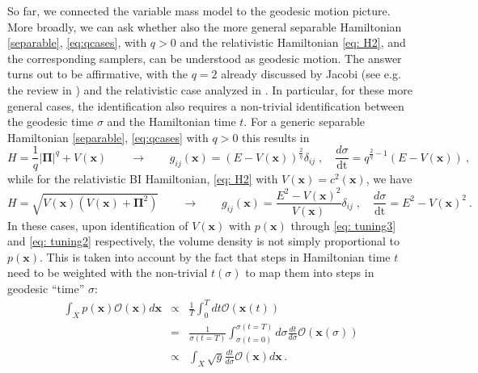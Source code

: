 \documentclass[twoside,11pt]{article}
\begin{document}
So far, we connected the variable mass model to the geodesic motion picture. 
More broadly, we can ask whether also the more general separable Hamiltonian \eqref{separable}, \eqref{eq:qcases}, with $q>0$ and the
relativistic Hamiltonian \eqref{eq: H2}, and the corresponding samplers, can be understood as geodesic motion.
The answer turns out to be affirmative, with the $q = 2$ already discussed by Jacobi (see e.g. the review in \citet{pettini2007geometry}) and the relativistic case analyzed in \citet{gibbons2015jacobi}. 
In particular, for these more general cases, the identification also requires a non-trivial identification
between the geodesic time $\sigma$ and the Hamiltonian time $t$.
For a generic separable Hamiltonian \eqref{separable}, \eqref{eq:qcases} with $q > 0$ this results in
\begin{equation}
  H = \frac{1}{q} \mathbf{|\Pi|}^q + V (\mathbf{x}) \qquad \rightarrow
  \qquad g_{i  j} (\mathbf{x}) = (E - V (\mathbf{x}))^\frac{2}{q} \delta_{i
   j} \;, \quad \frac{d \sigma}{\text{dt}} =q^{\frac{2}{q}-1} (E - V (\mathbf{x}))\:,
\end{equation}
while for the relativistic BI Hamiltonian,  \eqref{eq: H2} with $V(\mathbf{x}) = c^2(\mathbf{x})$, we have
\begin{equation}
  H = \sqrt{V (\mathbf{x}) (V (\mathbf{x}) + \mathbf{\Pi}^2)} \qquad
  \rightarrow \qquad g_{i  j} (\mathbf{x}) = \frac{E^2 - V
  (\mathbf{x})^2}{V (\mathbf{x})} \delta_{i  j} \;, \quad \frac{d
  \sigma}{\text{dt}} = E^2 - V (\mathbf{x})^2\:.
\end{equation}
In these cases, upon identification of $V (\mathbf{x})$ with $p
(\mathbf{x})$ through \eqref{eq: tuning3} and \eqref{eq: tuning2} respectively, the volume density is not simply proportional
to $p (\mathbf{x})$. This is taken into account by the fact that steps
in Hamiltonian time $t$ need to be weighted with the non-trivial $t (\sigma)$
to map them into steps in geodesic ``time'' $\sigma$:
\begin{eqnarray}
  \int_X p (\mathbf{x})  \mathcal{O} (\mathbf{x}) d \mathbf{x} & \propto
  & \frac{1}{T} \int_0^T d t \mathcal{O} (\mathbf{x} (t)) \\
  & = & \frac{1}{\sigma (t = T)} \int_{\sigma (t = 0)}^{\sigma (t = T)} d
  \sigma \frac{d t}{d \sigma}  \mathcal{O} (\mathbf{x} (\sigma)) \\
  & \propto & \int_X \sqrt{g}  \frac{d t}{d \sigma}  \mathcal{O}
  (\mathbf{x}) d \mathbf{x} \,.
\end{eqnarray}
\end{document}
